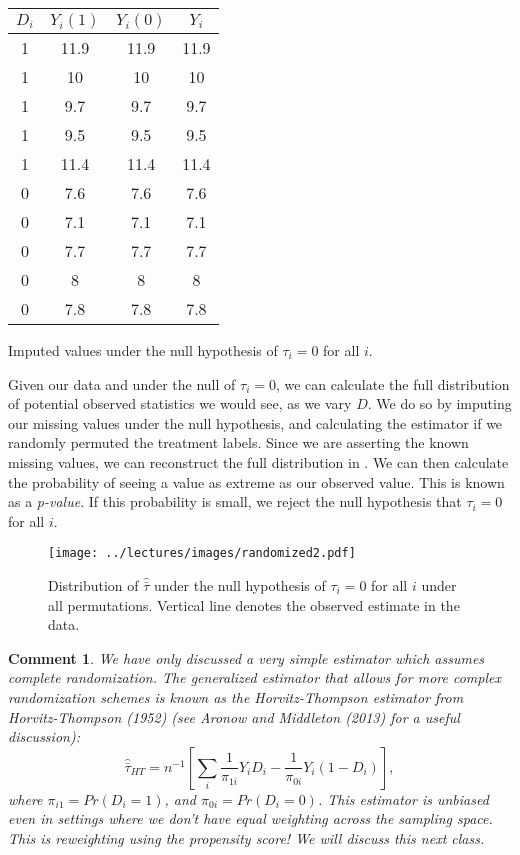 \documentclass{tufte-handout}
\theoremstyle{break}
\newtheorem{cmt}{Comment}
\begin{document}
\begin{margintable}
  \begin{tabular}{cccc}
 \toprule
 $D_{i}$ & $Y_{i}(1)$ & $Y_{i}(0)$ & $Y_{i}$\\
 \midrule
 1 &  11.9 & 11.9  & 11.9\\
 1 &  10   & 10  & 10\\
 1 &  9.7  & 9.7  & 9.7\\
 1 &  9.5  & 9.5 & 9.5 \\
 1 &  11.4 & 11.4  & 11.4\\
 0 & 7.6  &  7.6 & 7.6\\
 0 &  7.1  & 7.1  & 7.1\\
 0 &  7.7 &  7.7  & 7.7\\
 0 & 8  &  8 & 8  \\
 0 & 7.8  & 7.8 & 7.8\\
 \bottomrule
 \end{tabular}
 \caption{Imputed values under the null hypothesis of $\tau_{i} = 0$ for all $i$.}
\end{margintable}
 Given our data and under the null of $\tau_{i} = 0$, we can calculate the full distribution of potential observed statistics we would see, as we vary $D$. We do so by imputing our missing values under the null hypothesis, and calculating the estimator if we randomly permuted the treatment labels. Since we are asserting the known missing values, we can reconstruct the full distribution in . We can then calculate the probability of seeing a value as extreme as our observed value. This is known as a \emph{p-value}. If this probability is small, we reject the null hypothesis that $\tau_{i} = 0$ for all $i$.


\begin{figure}       
      \texttt{[image: ../lectures/images/randomized2.pdf]}
      \caption{Distribution of $\hat{\bar{\tau}}$ under the null hypothesis of $\tau_{i} = 0$ for all $i$ under all permutations. Vertical line denotes the observed estimate in the data.}
      \label{fig:randomized2}
\end{figure}

\begin{boxF}
  \begin{cmt}
    We have only discussed a very simple estimator which assumes complete randomization. The generalized estimator that allows for more complex randomization schemes is known as the Horvitz-Thompson estimator from Horvitz-Thompson (1952) (see Aronow and Middleton (2013) for a useful discussion):
    \begin{equation}
            \hat{\bar{\tau}}_{HT} = n^{-1}\left[\sum_{i}\frac{1}{\pi_{1i}}Y_{i}D_{i} - \frac{1}{\pi_{0i}}Y_{i}(1-D_{i})\right],
          \end{equation}
          where $\pi_{i1} = Pr(D_{i} = 1)$, and $\pi_{0i} = Pr(D_{i} = 0)$. This estimator is unbiased even in settings where we don't have equal weighting across the sampling space. This is reweighting using the propensity score! We will discuss this next class.
  \end{cmt}
\end{boxF}
\end{document}
